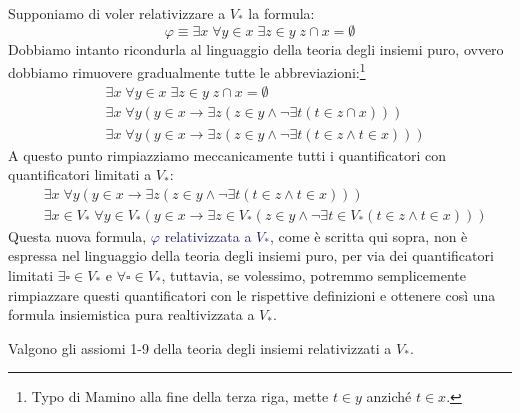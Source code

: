 \documentclass[11pt]{scrartcl}
\begin{document}
\begin{example}
	Supponiamo di voler relativizzare a $V_*$ la formula:
	\[ \varphi \equiv \exists x \; \forall y \in x \; \exists z \in y \; z \cap x = \emptyset
		\]
	Dobbiamo intanto ricondurla al linguaggio della teoria degli insiemi puro, ovvero dobbiamo rimuovere gradualmente tutte le abbreviazioni:\footnote{Typo di Mamino alla fine della terza riga, mette $t \in y$ anziché $t \in x$.}
	\begin{align*}
		& \exists x \; \forall y \in x \; \exists z \in y \; z \cap x = \emptyset \\
		& \exists x \; \forall y (y \in x \rightarrow \exists z (z \in y \land \neg \exists t (t \in z \cap x))) \\
		& \exists x \; \forall y (y \in x \rightarrow \exists z (z \in y \land \neg \exists t (t \in z \land t \in x)))
	\end{align*}
	A questo punto rimpiazziamo meccanicamente tutti i quantificatori con quantificatori limitati a $V_*$:
	\begin{align*}
		& \exists x \; \forall y (y \in x \rightarrow \exists z (z \in y \land \neg \exists t (t \in z \land t \in x))) \\
		& \exists x\in V_* \; \forall y \in V_* (y \in x \rightarrow \exists z \in V_* (z \in y \land \neg \exists t \in V_* (t \in z \land t \in x)))
	\end{align*}
	Questa nuova formula, \textcolor{MidnightBlue}{$\varphi$ relativizzata a $V_*$}, come è scritta qui sopra, non è espressa nel linguaggio della teoria degli insiemi puro, per via dei quantificatori limitati $\exists \square \in V_*$ e $\forall \square \in V_*$,
	tuttavia, se volessimo, potremmo semplicemente rimpiazzare questi quantificatori con le rispettive definizioni e ottenere così una formula insiemistica pura realtivizzata a $V_*$.
\end{example}

\begin{theorem}
	Valgono gli assiomi 1-9 della teoria degli insiemi relativizzati a $V_*$.
\end{theorem}
\end{document}
